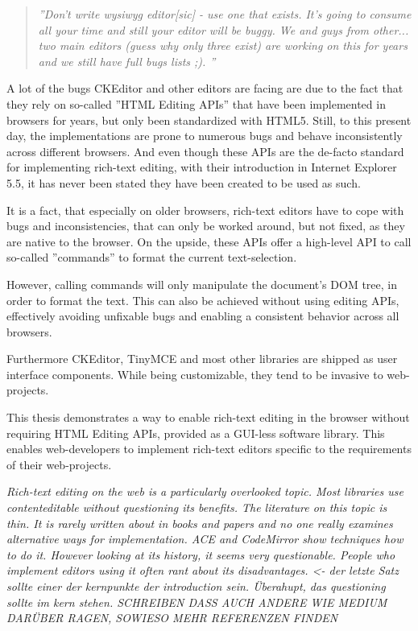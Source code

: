 \begin{quotation}
\textit{''Don't write wysiwyg editor[sic] - use one that exists. It's going to consume all your time and still your editor will be buggy. We and guys from other... two main editors (guess why only three exist) are working on this for years and we still have full bugs lists ;). \cite{sopp}''}
\end{quotation} %

A lot of the bugs CKEditor and other editors are facing are due to the fact that they rely on so-called ''HTML Editing APIs'' that have been implemented in browsers for years, but only been standardized with HTML5. Still, to this present day, the implementations are prone to numerous bugs and behave inconsistently across different browsers. And even though these APIs are the de-facto standard for implementing rich-text editing, with their introduction in Internet Explorer 5.5, it has never been stated they have been created to be used as such.

It is a fact, that especially on older browsers, rich-text editors have to cope with bugs and inconsistencies, that can only be worked around, but not fixed, as they are native to the browser. On the upside, these APIs offer a high-level API to call so-called ''commands'' to format the current text-selection. 

However, calling commands will only manipulate the document's DOM tree, in order to format the text. This can also be achieved without using editing APIs, effectively avoiding unfixable bugs and enabling a consistent behavior across all browsers.

Furthermore CKEditor, TinyMCE and most other libraries are shipped as user interface components. While being customizable, they tend to be invasive to web-projects.

This thesis demonstrates a way to enable rich-text editing in the browser without requiring HTML Editing APIs, provided as a GUI-less software library. This enables web-developers to implement rich-text editors specific to the requirements of their web-projects.

\textit{Rich-text editing on the web is a particularly overlooked topic. Most libraries use contenteditable without questioning its benefits. The literature on this topic is thin. It is rarely written about in books and papers and no one really examines alternative ways for implementation. ACE and CodeMirror show techniques how to do it. However looking at its history, it seems very questionable. People who implement editors using it often rant about its disadvantages. <- der letzte Satz sollte einer der kernpunkte der introduction sein. Überahupt, das questioning sollte im kern stehen. SCHREIBEN DASS AUCH ANDERE WIE MEDIUM DARÜBER RAGEN, SOWIESO MEHR REFERENZEN FINDEN}

